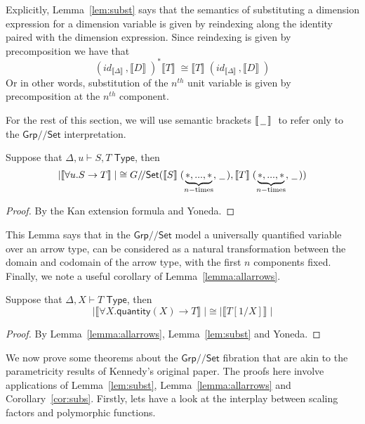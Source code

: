 \documentclass[a4paper,UKenglish]{lipics}
\newcommand{\msf}[1]{\mathsf{#1}} %
\newcommand{\Grp}{\msf{Grp}}
\newcommand{\Set}{\msf{Set}}
\newcommand{\blank}{\, \underline{\hspace{2mm}} \,}
\newcommand{\GroupSet}[1]{#1/\!/\Set}
\newcommand{\GrpSet}{\GroupSet{\Grp}}
\newcommand{\GSet}{\GroupSet{G}}
\newcommand{\sem}[1]{\ensuremath{\llbracket #1 \rrbracket} \;}
\newcommand{\qnt}{\msf{quantity}}
\begin{document}
Explicitly, Lemma~\ref{lem:subst} says that the semantics of substituting a dimension expression for a dimension variable is given by reindexing along the identity paired with the dimension expression. Since reindexing is given by precomposition we have that
\[
 (id_{\sem{\Delta}} , \sem{D})^\ast \sem{T} \cong \sem{T}(id_{\sem{\Delta}}, \sem{D})
\]
Or in other words, substitution of the $n^{th}$ unit variable is given by precomposition at the $n^{th}$ component.

For the rest of this section, we will use semantic brackets $\sem{\, \underline{\hspace{2mm}}\, }$ to refer only to the $\GrpSet$ interpretation.

\begin{lemma}
\label{lemma:allarrows}
 Suppose that $\Delta, u \vdash S,T \; \msf{ Type}$, then
\[
|\sem{\forall u. S \rightarrow T}| \cong \GSet (\sem{S}(\underbrace{\ast,...,\ast}_{n-\text{times}}, \blank),\sem{T}(\underbrace{\ast,...,\ast}_{n-\text{times}}, \blank))
\]
\end{lemma}
\begin{proof}
By the Kan extension formula and Yoneda.
\end{proof}

This Lemma says that in the $\GrpSet$ model a universally quantified variable over an arrow type, can be considered as a natural transformation between the domain and codomain of the arrow type, with the first $n$ components fixed. Finally, we note a useful corollary of Lemma~\ref{lemma:allarrows}.
\begin{corollary}
\label{cor:subs}
Suppose that $\Delta, X \vdash T \; \msf{ Type}$, then
 \[
  |\sem{\forall X . \qnt(X) \rightarrow T}| \cong |\sem{T[1/X]}|
\]
\end{corollary}
\begin{proof}
 By Lemma~\ref{lemma:allarrows}, Lemma~\ref{lem:subst} and Yoneda.
\end{proof}



We now prove some theorems about the $\GrpSet$ fibration that are akin to the parametricity results of Kennedy's original paper. The proofs here involve applications of Lemma~\ref{lem:subst}, Lemma~\ref{lemma:allarrows} and Corollary~\ref{cor:subs}. Firstly, lets have a look at the interplay between scaling factors and polymorphic functions.
\end{document}
